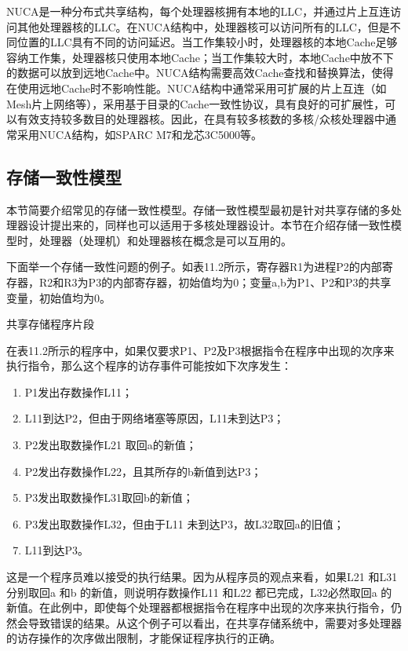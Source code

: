 \documentclass[]{ctexbook}
\providecommand{\tightlist}{%
  \setlength{\itemsep}{0pt}\setlength{\parskip}{0pt}}
\begin{document}
NUCA是一种分布式共享结构，每个处理器核拥有本地的LLC，并通过片上互连访问其他处理器核的LLC。在NUCA结构中，处理器核可以访问所有的LLC，但是不同位置的LLC具有不同的访问延迟。当工作集较小时，处理器核的本地Cache足够容纳工作集，处理器核只使用本地Cache；当工作集较大时，本地Cache中放不下的数据可以放到远地Cache中。NUCA结构需要高效Cache查找和替换算法，使得在使用远地Cache时不影响性能。NUCA结构中通常采用可扩展的片上互连（如Mesh片上网络等），采用基于目录的Cache一致性协议，具有良好的可扩展性，可以有效支持较多数目的处理器核。因此，在具有较多核数的多核/众核处理器中通常采用NUCA结构，如SPARC M7和龙芯3C5000等。

\hypertarget{ux5b58ux50a8ux4e00ux81f4ux6027ux6a21ux578b}{%
\subsection{存储一致性模型}\label{ux5b58ux50a8ux4e00ux81f4ux6027ux6a21ux578b}}

本节简要介绍常见的存储一致性模型。存储一致性模型最初是针对共享存储的多处理器设计提出来的，同样也可以适用于多核处理器设计。本节在介绍存储一致性模型时，处理器（处理机）和处理器核在概念是可以互用的。

下面举一个存储一致性问题的例子。如表11.2所示，寄存器R1为进程P2的内部寄存器，R2和R3为P3的内部寄存器，初始值均为0；变量a,b为P1、P2和P3的共享变量，初始值均为0。

\label{tab:shared-memory-program}共享存储程序片段

在表11.2所示的程序中，如果仅要求P1、P2及P3根据指令在程序中出现的次序来执行指令，那么这个程序的访存事件可能按如下次序发生：

\begin{enumerate}
\def\labelenumi{\arabic{enumi}.}
\tightlist
\item
  P1发出存数操作L11；
\item
  L11到达P2，但由于网络堵塞等原因，L11未到达P3；
\item
  P2发出取数操作L21 取回a的新值；
\item
  P2发出存数操作L22，且其所存的b新值到达P3；
\item
  P3发出取数操作L31取回b的新值；
\item
  P3发出取数操作L32，但由于L11 未到达P3，故L32取回a的旧值；
\item
  L11到达P3。
\end{enumerate}

这是一个程序员难以接受的执行结果。因为从程序员的观点来看，如果L21 和L31分别取回a 和b 的新值，则说明存数操作L11 和L22 都已完成，L32必然取回a 的新值。在此例中，即使每个处理器都根据指令在程序中出现的次序来执行指令，仍然会导致错误的结果。从这个例子可以看出，在共享存储系统中，需要对多处理器的访存操作的次序做出限制，才能保证程序执行的正确。
\end{document}
